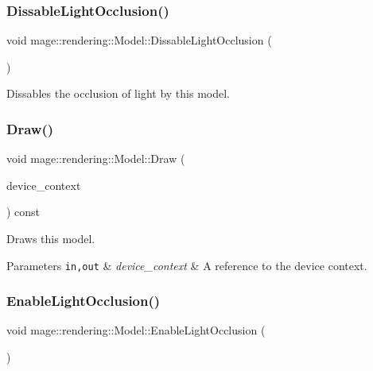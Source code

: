 \subsubsection{\texorpdfstring{Dissable\+Light\+Occlusion()}{DissableLightOcclusion()}}
{\footnotesize\ttfamily void mage\+::rendering\+::\+Model\+::\+Dissable\+Light\+Occlusion (\begin{DoxyParamCaption}{ }\end{DoxyParamCaption})\hspace{0.3cm}{\ttfamily [noexcept]}}

Dissables the occlusion of light by this model. \mbox{\label{classmage_1_1rendering_1_1_model_aaa10d71022d4f6ac8e51ec95861f3317}} 
\subsubsection{\texorpdfstring{Draw()}{Draw()}}
{\footnotesize\ttfamily void mage\+::rendering\+::\+Model\+::\+Draw (\begin{DoxyParamCaption}\item[{I\+D3\+D11\+Device\+Context \&}]{device\+\_\+context }\end{DoxyParamCaption}) const\hspace{0.3cm}{\ttfamily [noexcept]}}

Draws this model.


\begin{DoxyParams}[1]{Parameters}
\mbox{\tt in,out}  & {\em device\+\_\+context} & A reference to the device context. \\
\hline
\end{DoxyParams}
\mbox{\label{classmage_1_1rendering_1_1_model_a6fc53c4d0d5983ecd2f1910002b4dcfc}} 
\subsubsection{\texorpdfstring{Enable\+Light\+Occlusion()}{EnableLightOcclusion()}}
{\footnotesize\ttfamily void mage\+::rendering\+::\+Model\+::\+Enable\+Light\+Occlusion (\begin{DoxyParamCaption}{ }\end{DoxyParamCaption})\hspace{0.3cm}{\ttfamily [noexcept]}}

